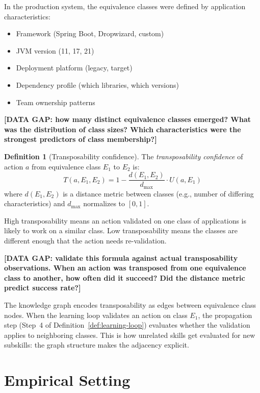 \documentclass[11pt]{article}
\theoremstyle{definition}
\newtheorem{definition}{Definition}
\begin{document}
In the production system, the equivalence classes were defined by
application characteristics:

\begin{itemize}
\item Framework (Spring Boot, Dropwizard, custom)
\item JVM version (11, 17, 21)
\item Deployment platform (legacy, target)
\item Dependency profile (which libraries, which versions)
\item Team ownership patterns
\end{itemize}

\textbf{[DATA GAP: how many distinct equivalence classes emerged? What
was the distribution of class sizes? Which characteristics were the
strongest predictors of class membership?]}

\begin{definition}[Transposability confidence]
\label{def:transposability}
The \emph{transposability confidence} of action $a$ from equivalence
class $E_1$ to $E_2$ is:
\[
T(a, E_1, E_2) = 1 - \frac{d(E_1, E_2)}{d_{\max}} \cdot U(a, E_1)
\]
where $d(E_1, E_2)$ is a distance metric between classes (e.g., number
of differing characteristics) and $d_{\max}$ normalizes to $[0, 1]$.
\end{definition}

High transposability means an action validated on one class of
applications is likely to work on a similar class. Low transposability
means the classes are different enough that the action needs
re-validation.

\textbf{[DATA GAP: validate this formula against actual transposability
observations. When an action was transposed from one equivalence class
to another, how often did it succeed? Did the distance metric predict
success rate?]}

The knowledge graph encodes transposability as edges between equivalence
class nodes. When the learning loop validates an action on class $E_1$,
the propagation step (Step~4 of Definition~\ref{def:learning-loop})
evaluates whether the validation applies to neighboring classes. This
is how unrelated skills get evaluated for new subskills: the graph
structure makes the adjacency explicit.

\section{Empirical Setting}
\label{sec:empirical}
\end{document}
